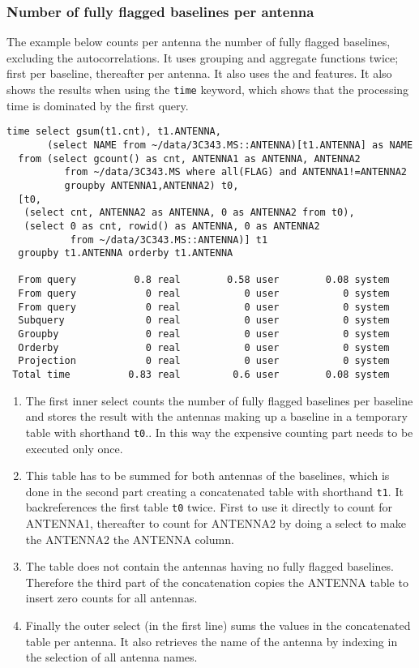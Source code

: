 \subsubsection{Number of fully flagged baselines per antenna}
The example below counts per antenna the number of fully
flagged baselines, excluding the autocorrelations. It uses grouping
and aggregate functions twice; first per baseline, thereafter per
antenna.
It also uses the  and
 features. It also shows the
results when using the {\tt time} keyword, which shows that the
processing time is dominated by the first query.
\begin{verbatim}
time select gsum(t1.cnt), t1.ANTENNA,
       (select NAME from ~/data/3C343.MS::ANTENNA)[t1.ANTENNA] as NAME
  from (select gcount() as cnt, ANTENNA1 as ANTENNA, ANTENNA2
          from ~/data/3C343.MS where all(FLAG) and ANTENNA1!=ANTENNA2
          groupby ANTENNA1,ANTENNA2) t0,
  [t0,
   (select cnt, ANTENNA2 as ANTENNA, 0 as ANTENNA2 from t0),
   (select 0 as cnt, rowid() as ANTENNA, 0 as ANTENNA2
           from ~/data/3C343.MS::ANTENNA)] t1
  groupby t1.ANTENNA orderby t1.ANTENNA

  From query          0.8 real        0.58 user        0.08 system
  From query            0 real           0 user           0 system
  From query            0 real           0 user           0 system
  Subquery              0 real           0 user           0 system
  Groupby               0 real           0 user           0 system
  Orderby               0 real           0 user           0 system
  Projection            0 real           0 user           0 system
 Total time          0.83 real         0.6 user        0.08 system
\end{verbatim}
\begin{enumerate}
\item
The first inner select counts the number
of fully flagged baselines per baseline and stores the result with the
antennas making up a baseline in a
temporary table with shorthand {\tt t0}.. In this way the expensive
counting part needs to be executed only once.
\item
This table has to be
summed for both antennas of the baselines, which is done in the second part
creating a concatenated table with shorthand {\tt t1}.
It backreferences the first table {\tt t0} twice. First to use it
directly to count for ANTENNA1, thereafter to count for ANTENNA2 by doing a
select to make the ANTENNA2 the ANTENNA column. 
\item
The table does not contain the antennas having no fully flagged
baselines. Therefore the third part of the concatenation
copies the ANTENNA table to insert zero counts for all antennas.
\item
Finally the outer select (in the first line) sums the values in the
concatenated table per antenna. It also retrieves the name of the
antenna by indexing  in the selection of all antenna names.
\end{enumerate}



